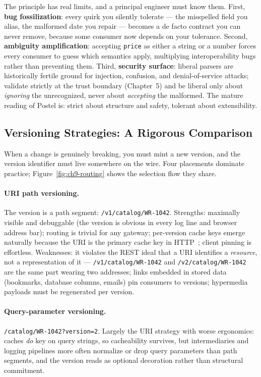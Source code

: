 The principle has real limits, and a principal engineer must know them.
First, \textbf{bug fossilization}: every quirk you silently tolerate ---
the misspelled field you alias, the malformed date you repair --- becomes a
de facto contract you can never remove, because some consumer now depends on
your tolerance. Second, \textbf{ambiguity amplification}: accepting
\texttt{price} as either a string or a number forces every consumer to guess
which semantics apply, multiplying interoperability bugs rather than
preventing them. Third, \textbf{security surface}: liberal parsers are
historically fertile ground for injection, confusion, and denial-of-service
attacks; validate strictly at the trust boundary (Chapter~5) and be liberal
only about \emph{ignoring} the unrecognized, never about \emph{accepting} the
malformed. The mature reading of Postel is: strict about structure and safety,
tolerant about extensibility.

\subsection{Versioning Strategies: A Rigorous Comparison}
\label{subsec:ch9-strategies}

When a change is genuinely breaking, you must mint a new version, and the
version identifier must live somewhere on the wire. Four placements dominate
practice; Figure~\ref{fig:ch9-routing} shows the selection flow they share.

\paragraph{URI path versioning.} The version is a path segment:
\texttt{/v1/catalog/WR-1042}. Strengths: maximally visible and debuggable
(the version is obvious in every log line and browser address bar); routing
is trivial for any gateway; per-version cache keys emerge naturally because
the URI is the primary cache key in HTTP~\cite{rfc9110}; client pinning is
effortless. Weaknesses: it violates the REST ideal that a URI identifies a
\emph{resource}, not a representation of it --- \texttt{/v1/catalog/WR-1042}
and \texttt{/v2/catalog/WR-1042} are the same part wearing two addresses;
links embedded in stored data (bookmarks, database columns, emails) pin
consumers to versions; hypermedia payloads must be regenerated per version.

\paragraph{Query-parameter versioning.} \texttt{/catalog/WR-1042?version=2}.
Largely the URI strategy with worse ergonomics: caches \emph{do} key on query
strings, so cacheability survives, but intermediaries and logging pipelines
more often normalize or drop query parameters than path segments, and the
version reads as optional decoration rather than structural commitment.


